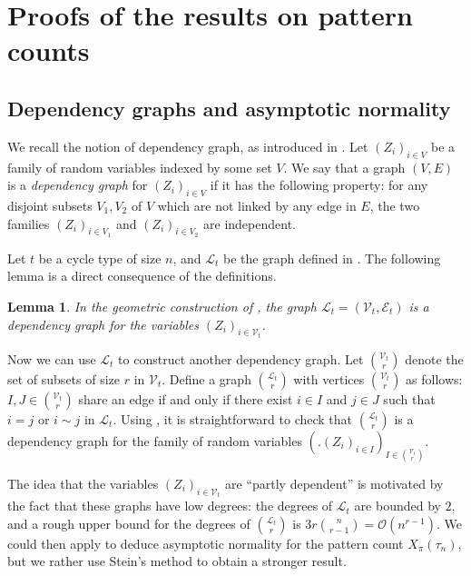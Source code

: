 \documentclass{article}
\newtheorem{lem}[theorem]{Lemma}
\theoremstyle{remark}
\def\O{\mathcal{O}}
\def\L{\mathcal{L}}
\def\Vert{\mathcal{V}}
\def\Edges{\mathcal{E}}
\begin{document}
\section{Proofs of the results on pattern counts}
\label{sec: proof pattern}

\subsection{Dependency graphs and asymptotic normality}\label{sec: dependency graph}

We recall the notion of dependency graph, as introduced in \cite{PL82}.
Let $(Z_i)_{i\in V}$ be a family of random variables indexed by some set $V$.
We say that a graph $(V,E)$ is a {\em dependency graph} for $(Z_i)_{i\in V}$ if it has the following property:
for any disjoint subsets $V_1,V_2$ of $V$ which are not linked by any edge in $E$, the two families $(Z_i)_{i\in V_1}$ and $(Z_i)_{i\in V_2}$ are independent.

Let $t$ be a cycle type of size $n$, and $\L_t$ be the graph defined in .
The following lemma is a direct consequence of the definitions.

\begin{lem}\label{lem: dependency graph}
    In the geometric construction of , the graph $\L_t=(\Vert_t,\Edges_t)$ is a dependency graph for the variables $(Z_i)_{i\in\Vert_t}$.
\end{lem}

Now we can use $\L_t$ to construct another dependency graph.
Let $\binom{\Vert_t}{r}$ denote the set of subsets of size $r$ in $\Vert_t$.
Define a graph $\binom{\L_t}{r}$ with vertices $\binom{\Vert_t}{r}$ as follows:
$I,J\in\binom{\Vert_t}{r}$ share an edge if and only if there exist $i\in I$ and $j\in J$ such that $i=j$ or $i\sim j$ in $\L_t$.
Using , it is straightforward to check that $\binom{\L_t}{r}$ is a dependency graph for the family of random variables $\left(\big. (Z_i)_{i\in I} \right)_{I\in\binom{\Vert_t}{r}}$.

The idea that the variables $(Z_i)_{i\in\Vert_t}$ are ``partly dependent'' is motivated by the fact that these graphs have low degrees:
the degrees of $\L_t$ are bounded by $2$, and a rough upper bound for the degrees of $\binom{\L_t}{r}$ is $3r\binom{n}{r-1} = \O\left( n^{r-1} \right)$.
We could then apply \cite[Theorem~2]{J88} to deduce asymptotic normality for the pattern count $X_\pi(\tau_n)$, but we rather use Stein's method to obtain a stronger result.
\end{document}
